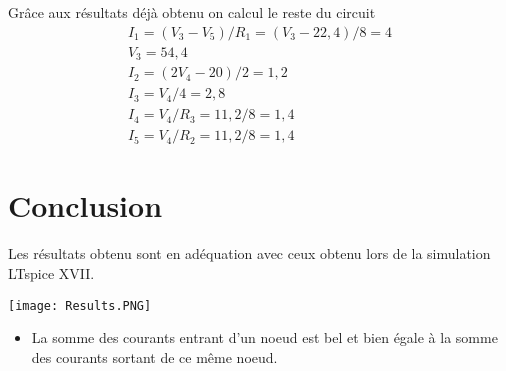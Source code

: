 \documentclass{homeworg}
\begin{document}
    Grâce aux résultats déjà obtenu on calcul le reste du circuit
    \begin{align}
        I_1 = (V_3 - V_5) / R_1 = (V_3 - 22,4) / 8 = 4\\
        V_3 = 54,4\\
        I_2 = (2V_4 - 20) / 2 = 1,2\\
        I_3 = V_4/4 = 2,8\\
        I_4 = V_4 / R_3 = 11,2 / 8 = 1,4\\
        I_5 = V_4 / R_2 = 11,2 / 8 = 1,4
    \end{align}

\section{Conclusion}
    Les résultats obtenu sont en adéquation avec ceux obtenu lors de la simulation LTspice XVII.
    \begin{center}
        \texttt{[image: Results.PNG]}
    \end{center}
    \begin{itemize}
        \item La somme des courants entrant d'un noeud est bel et bien égale à la somme des courants sortant de ce même noeud.
    \end{itemize}
\end{document}
